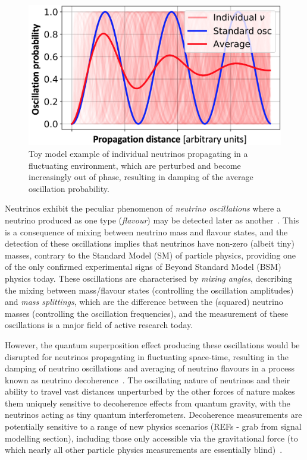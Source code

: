 \documentclass[a4paper,11pt]{article}
\begin{document}
\begin{figure} %
    \centering
		\vspace{-7pt}
		\includegraphics[width=1.\linewidth]{images/decoherence.png}
		\caption{Toy model example of individual neutrinos propagating in a fluctuating environment, which are perturbed and become increasingly out of phase, resulting in damping of the average oscillation probability.}
		\vspace{-5pt}
		\label{fig:decoherence}
\end{figure}

Neutrinos exhibit the peculiar phenomenon of \textit{neutrino oscillations} where a neutrino produced as one type (\textit{flavour}) may be detected later as another~\cite{Fukuda:1998mi, Ahmad:2001an,Ahmad:2002jz}. This is a consequence of mixing between neutrino mass and flavour states, and the detection of these oscillations implies that neutrinos have non-zero (albeit tiny) masses, contrary to the Standard Model (SM) of particle physics, providing one of the only confirmed experimental signs of Beyond Standard Model (BSM) physics today. These oscillations are characterised by \textit{mixing angles}, describing the mixing between mass/flavour states (controlling the oscillation amplitudes) and \textit{mass splittings}, which are the difference between the (squared) neutrino masses (controlling the oscillation frequencies), and the measurement of these oscillations is a major field of active research today.

However, the quantum superposition effect producing these oscillations would be disrupted for neutrinos propagating in fluctuating space-time, resulting in the damping of neutrino oscillations and averaging of neutrino flavours in a process known as neutrino decoherence~\cite{Benatti_2000, PhysRevLett.85.1166}. The oscillating nature of neutrinos and their ability to travel vast distances unperturbed by the other forces of nature makes them uniquely sensitive to decoherence effects from quantum gravity, with the neutrinos acting as tiny quantum interferometers. Decoherence measurements are potentially sensitive to a range of new physics scenarios (REFs - grab from signal modelling section), including those only accessible via the gravitational force (to which nearly all other particle physics measurements are essentially blind)~\cite{Hellmann:2021jyz}.
\end{document}
